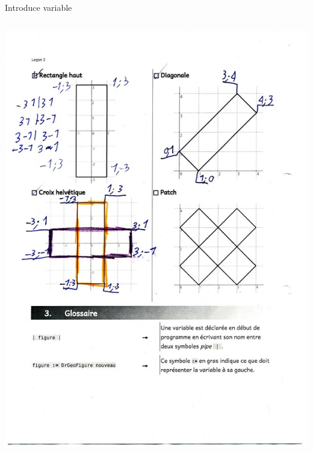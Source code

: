 \documentclass{beamer}
\begin{document}
\begin{frame}[fragile]{Introduce variable\cite{lesson2}}
\begin{columns}[t]
\begin{column}{0.6\textwidth}
      \includegraphics[width=\textwidth]{lesson2Challenges.jpg}
    \end{column}  
  \end{columns}  
\end{frame}
\end{document}
